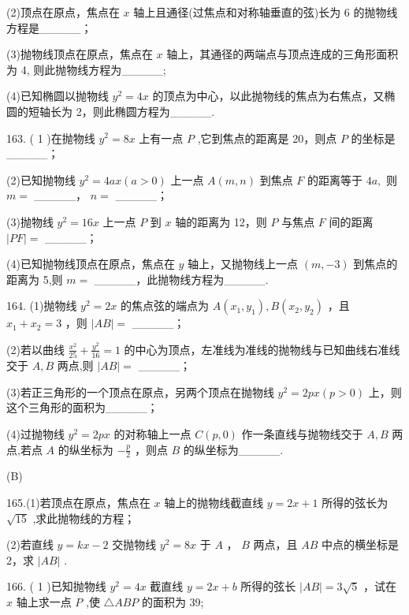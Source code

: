 \documentclass[10pt]{article}
\begin{document}
(2)顶点在原点，焦点在 \(x\) 轴上且通径(过焦点和对称轴垂直的弦)长为 6 的抛物线方程是\_\_\_\_\_；

(3)抛物线顶点在原点，焦点在 \(x\) 轴上，其通径的两端点与顶点连成的三角形面积为 4, 则此抛物线方程为\_\_\_\_\_;

(4)已知椭圆以抛物线 \({y}^{2} = {4x}\) 的顶点为中心，以此抛物线的焦点为右焦点，又椭圆的短轴长为 2，则此椭圆方程为\_\_\_\_\_.

163. ( 1 )在抛物线 \({y}^{2} = {8x}\) 上有一点 \(P\) ,它到焦点的距离是 20，则点 \(P\) 的坐标是\_\_\_\_\_；

(2)已知抛物线 \({y}^{2} = {4ax}\left( {a > 0}\right)\) 上一点 \(A\left( {m,n}\right)\) 到焦点 \(F\) 的距离等于 \({4a},\) 则 \(m =\) \_\_\_\_\_， \(n =\) \_\_\_\_\_；

(3)抛物线 \({y}^{2} = {16x}\) 上一点 \(P\) 到 \(x\) 轴的距离为 12，则 \(P\) 与焦点 \(F\) 间的距离 \(\left| {PF}\right|  =\) \_\_\_\_\_；

(4)已知抛物线顶点在原点，焦点在 \(y\) 轴上，又抛物线上一点 \(\left( {m, - 3}\right)\) 到焦点的距离为 5,则 \(m =\) \_\_\_\_\_，此抛物线方程为\_\_\_\_\_.

164. (1)抛物线 \({y}^{2} = {2x}\) 的焦点弦的端点为 \(A\left( {{x}_{1},{y}_{1}}\right) ,B\left( {{x}_{2},{y}_{2}}\right)\) ，且 \({x}_{1} + {x}_{2} = 3\) ，则 \(\left| {AB}\right|  =\) \_\_\_\_\_；

(2)若以曲线 \(\frac{{x}^{2}}{25} + \frac{{y}^{2}}{16} = 1\) 的中心为顶点，左准线为准线的抛物线与已知曲线右准线交于 \(A,B\) 两点,则 \(\left| {AB}\right|  =\) \_\_\_\_\_；

(3)若正三角形的一个顶点在原点，另两个顶点在抛物线 \({y}^{2} = {2px}\left( {p > 0}\right)\) 上，则这个三角形的面积为\_\_\_\_\_；

(4)过抛物线 \({y}^{2} = {2px}\) 的对称轴上一点 \(C\left( {p,0}\right)\) 作一条直线与抛物线交于 \(A,B\) 两点,若点 \(A\) 的纵坐标为 \(- \frac{p}{2}\) ，则点 \(B\) 的纵坐标为\_\_\_\_\_.

(B)

165.(1)若顶点在原点，焦点在 \(x\) 轴上的抛物线截直线 \(y = {2x} + 1\) 所得的弦长为 \(\sqrt{15}\) ,求此抛物线的方程；

(2)若直线 \(y = {kx} - 2\) 交抛物线 \({y}^{2} = {8x}\) 于 \(A\) ， \(B\) 两点，且 \({AB}\) 中点的横坐标是 2，求 \(\left| {AB}\right|\) .

166. ( 1 )已知抛物线 \({y}^{2} = {4x}\) 截直线 \(y = {2x} + b\) 所得的弦长 \(\left| {AB}\right|  = 3\sqrt{5}\) ，试在 \(x\) 轴上求一点 \(P\) ,使 \(\bigtriangleup {ABP}\) 的面积为 39;
\end{document}
